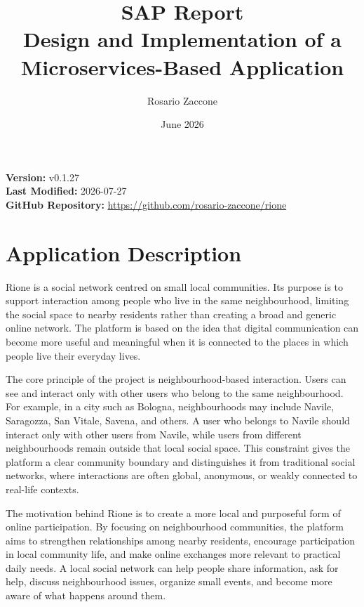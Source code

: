\documentclass[12pt,a4paper]{article}
\title{\textbf{SAP Report}\\
\large Design and Implementation of a Microservices-Based Application}
\author{Rosario Zaccone}
\date{June 2026}
\newcommand{\reportversion}{v0.1.27}
\newcommand{\reportlastmodified}{2026-07-27}
\begin{document}
\maketitle

\begin{center}
    \textbf{Version:} \reportversion\\
    \textbf{Last Modified:} \reportlastmodified\\
    \textbf{GitHub Repository:} \url{https://github.com/rosario-zaccone/rione}
\end{center}

\tableofcontents
\newpage

\section{Application Description}

Rione is a social network centred on small local communities. Its purpose is to support interaction among people who live in the same neighbourhood, limiting the social space to nearby residents rather than creating a broad and generic online network. The platform is based on the idea that digital communication can become more useful and meaningful when it is connected to the places in which people live their everyday lives.

The core principle of the project is neighbourhood-based interaction. Users can see and interact only with other users who belong to the same neighbourhood. For example, in a city such as Bologna, neighbourhoods may include Navile, Saragozza, San Vitale, Savena, and others. A user who belongs to Navile should interact only with other users from Navile, while users from different neighbourhoods remain outside that local social space. This constraint gives the platform a clear community boundary and distinguishes it from traditional social networks, where interactions are often global, anonymous, or weakly connected to real-life contexts.

The motivation behind Rione is to create a more local and purposeful form of online participation. By focusing on neighbourhood communities, the platform aims to strengthen relationships among nearby residents, encourage participation in local community life, and make online exchanges more relevant to practical daily needs. A local social network can help people share information, ask for help, discuss neighbourhood issues, organize small events, and become more aware of what happens around them.
\end{document}

